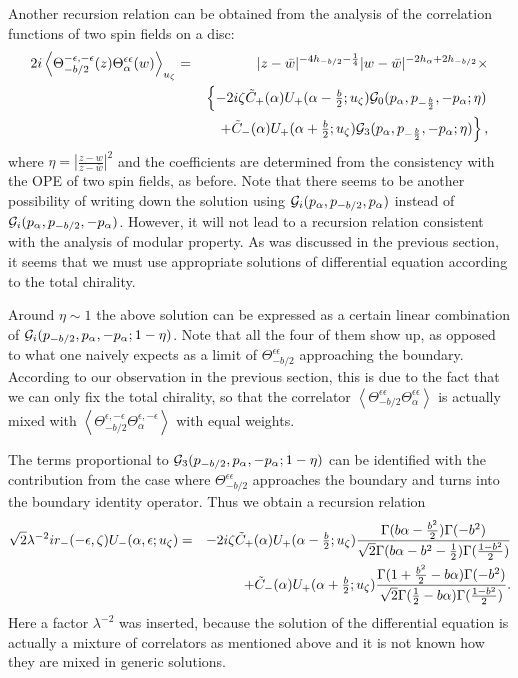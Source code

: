 \documentclass[a4paper,12pt]{article}
\newcommand{\vev}[1]{\left<{#1}\right>}
\newcommand{\tfrac}[2]{{\textstyle\frac{#1}{#2}}}
\newcommand{\cG}{{\cal G}}
\newcommand{\ep}{{\epsilon}}
\begin{document}
   Another recursion relation can be obtained from the analysis
 of the correlation functions of two spin fields on a disc:
\begin{eqnarray}
 2i\vev{\Theta_{-b/2}^{-\ep,-\ep}(z)\Theta_\alpha^{\ep\ep}(w)}_{u_\zeta}
 &=&
  |z-\bar{w}|^{-4h_{-b/2}-\frac{1}{4}}
  |w-\bar{w}|^{-2h_\alpha+2h_{-b/2}} \times
 \nonumber \\ &&
   \left\{
     -2i\zeta\tilde{C}_+(\alpha) U_+(\alpha-\tfrac{b}{2};u_\zeta)
     \cG_0(p_\alpha,p_{-\frac{b}{2}},-p_\alpha;\eta)
   \right.\nonumber \\ && \left. ~~~
    +\tilde{C}_-(\alpha)U_+(\alpha+\tfrac{b}{2};u_\zeta)
     \cG_3(p_\alpha,p_{-\frac{b}{2}},-p_\alpha;\eta)
   \right\},
\end{eqnarray}
 where $\eta=\left|\frac{z-w}{z-\bar{w}}\right|^2$ and
 the coefficients are determined from the consistency
 with the OPE of two spin fields, as before.
 Note that there seems to be another possibility of writing down the
 solution using $\cG_i(p_\alpha,p_{-b/2},p_\alpha)$
 instead of $\cG_i(p_\alpha,p_{-b/2},-p_\alpha)$.
 However, it will not lead to a recursion relation consistent with
 the analysis of modular property.
 As was discussed in the previous section, it seems that we must
 use appropriate solutions of differential equation according to the total
 chirality.

   Around $\eta\sim1$ the above solution can be expressed as
 a certain linear combination of $\cG_i(p_{-b/2},p_\alpha,-p_\alpha;1-\eta)$.
 Note that all the four of them show up, as opposed to what one
 naively expects as a limit of $\Theta_{-b/2}^{\ep\ep}$
 approaching the boundary.
 According to our observation in the previous section, this is due to
 the fact that we can only fix the total chirality,
 so that the correlator
 $\vev{\Theta_{-b/2}^{\ep\ep}\Theta_\alpha^{\ep\ep}}$
 is actually mixed with
 $\vev{\Theta_{-b/2}^{\ep,-\ep}\Theta_\alpha^{\ep,-\ep}}$
 with equal weights.

   The terms proportional to $\cG_3(p_{-b/2},p_\alpha,-p_\alpha;1-\eta)$
 can be identified with the contribution from the case
 where $\Theta_{-b/2}^{\ep\ep}$ approaches
 the boundary and turns into the boundary identity operator.
 Thus we obtain a recursion relation
\begin{eqnarray}
 \sqrt{2}\lambda^{-2}ir_-(-\ep,\zeta) U_-(\alpha,\ep;u_\zeta)
 &=&
  -2i\zeta\tilde{C}_+(\alpha) U_+(\alpha-\tfrac{b}{2};u_\zeta)
  \frac{\Gamma(b\alpha-\frac{b^2}{2})\Gamma(-b^2)}
  {\sqrt{2}\Gamma(b\alpha-b^2-\frac{1}{2})\Gamma(\frac{1-b^2}{2})}
 \nonumber \\ && \hskip-10mm
  +\tilde{C}_-(\alpha)U_+(\alpha+\tfrac{b}{2};u_\zeta)
  \frac{\Gamma(1+\frac{b^2}{2}-b\alpha)\Gamma(-b^2)}
  {\sqrt{2}\Gamma(\frac{1}{2}-b\alpha)\Gamma(\frac{1-b^2}{2})}.
\label{rcU2}
\end{eqnarray}
 Here a factor $\lambda^{-2}$ was inserted,
 because the solution of the differential equation is actually a mixture
 of correlators as mentioned above and it is not known
 how they are mixed in generic solutions.
\end{document}

